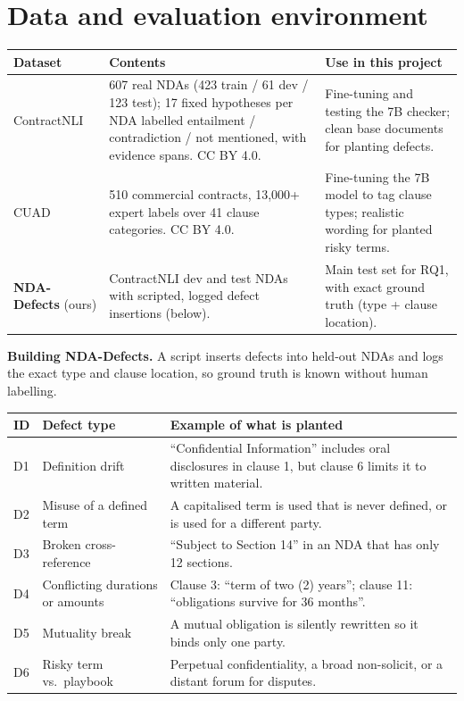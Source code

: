 \documentclass[11pt,a4paper]{article}
\begin{document}
\section{Data and evaluation environment}
\begin{table}[H]
\small
\begin{tabularx}{\textwidth}{@{}p{2.5cm}LL@{}}
\toprule
\textbf{Dataset} & \textbf{Contents} & \textbf{Use in this project} \\
\midrule
ContractNLI~\cite{contractnli} & 607 real NDAs (423 train / 61 dev / 123 test); 17 fixed hypotheses per NDA labelled entailment / contradiction / not mentioned, with evidence spans. CC BY 4.0. & Fine-tuning and testing the 7B checker; clean base documents for planting defects. \\
CUAD~\cite{cuad} & 510 commercial contracts, 13{,}000+ expert labels over 41 clause categories. CC BY 4.0. & Fine-tuning the 7B model to tag clause types; realistic wording for planted risky terms. \\
\textbf{NDA-Defects} (ours) & ContractNLI dev and test NDAs with scripted, logged defect insertions (below). & Main test set for RQ1, with exact ground truth (type + clause location). \\
\bottomrule
\end{tabularx}
\end{table}

\textbf{Building NDA-Defects.} A script inserts defects into held-out NDAs and logs the exact type and clause location,
so ground truth is known without human labelling.

\begin{table}[H]
\small
\begin{tabularx}{\textwidth}{@{}p{0.6cm}p{4.9cm}L@{}}
\toprule
\textbf{ID} & \textbf{Defect type} & \textbf{Example of what is planted} \\
\midrule
D1 & Definition drift & ``Confidential Information'' includes oral disclosures in clause 1, but clause 6 limits it to written material. \\
D2 & Misuse of a defined term & A capitalised term is used that is never defined, or is used for a different party. \\
D3 & Broken cross-reference & ``Subject to Section 14'' in an NDA that has only 12 sections. \\
D4 & Conflicting durations or amounts & Clause 3: ``term of two (2) years''; clause 11: ``obligations survive for 36 months''. \\
D5 & Mutuality break & A mutual obligation is silently rewritten so it binds only one party. \\
D6 & Risky term vs.\ playbook & Perpetual confidentiality, a broad non-solicit, or a distant forum for disputes. \\
\bottomrule
\end{tabularx}
\end{table}
\end{document}
